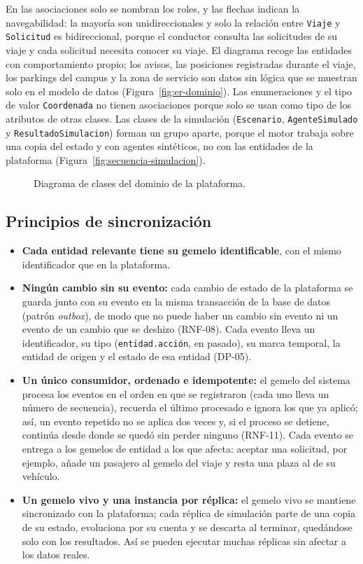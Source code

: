 En las asociaciones solo se nombran los roles, y las flechas indican la navegabilidad: la mayoría son unidireccionales y solo la relación entre \texttt{Viaje} y \texttt{Solicitud} es bidireccional, porque el conductor consulta las solicitudes de su viaje y cada solicitud necesita conocer su viaje. El diagrama recoge las entidades con comportamiento propio; los avisos, las posiciones registradas durante el viaje, los parkings del campus y la zona de servicio son datos sin lógica que se muestran solo en el modelo de datos (Figura~\ref{fig:er-dominio}). Las enumeraciones y el tipo de valor \texttt{Coordenada} no tienen asociaciones porque solo se usan como tipo de los atributos de otras clases. Las clases de la simulación (\texttt{Escenario}, \texttt{AgenteSimulado} y \texttt{ResultadoSimulacion}) forman un grupo aparte, porque el motor trabaja sobre una copia del estado y con agentes sintéticos, no con las entidades de la plataforma (Figura~\ref{fig:secuencia-simulacion}).

\begin{figure}
  \centering
  \resizebox{\linewidth}{!}{}
  \caption{Diagrama de clases del dominio de la plataforma.}
  \label{fig:clases}
\end{figure}

\subsection{Principios de sincronización}
\label{sec:sincronizacion-dt}

\begin{itemize}
    \item \textbf{Cada entidad relevante tiene su gemelo identificable}, con el mismo identificador que en la plataforma.
    \item \textbf{Ningún cambio sin su evento:} cada cambio de estado de la plataforma se guarda junto con su evento en la misma transacción de la base de datos (patrón \textit{outbox}), de modo que no puede haber un cambio sin evento ni un evento de un cambio que se deshizo (RNF-08). Cada evento lleva un identificador, su tipo (\texttt{entidad.acción}, en pasado), su marca temporal, la entidad de origen y el estado de esa entidad (DP-05).
    \item \textbf{Un único consumidor, ordenado e idempotente:} el gemelo del sistema procesa los eventos en el orden en que se registraron (cada uno lleva un número de secuencia), recuerda el último procesado e ignora los que ya aplicó; así, un evento repetido no se aplica dos veces y, si el proceso se detiene, continúa desde donde se quedó sin perder ninguno (RNF-11). Cada evento se entrega a los gemelos de entidad a los que afecta: aceptar una solicitud, por ejemplo, añade un pasajero al gemelo del viaje y resta una plaza al de su vehículo.
    \item \textbf{Un gemelo vivo y una instancia por réplica:} el gemelo vivo se mantiene sincronizado con la plataforma; cada réplica de simulación parte de una copia de su estado, evoluciona por su cuenta y se descarta al terminar, quedándose solo con los resultados. Así se pueden ejecutar muchas réplicas sin afectar a los datos reales.
\end{itemize}

